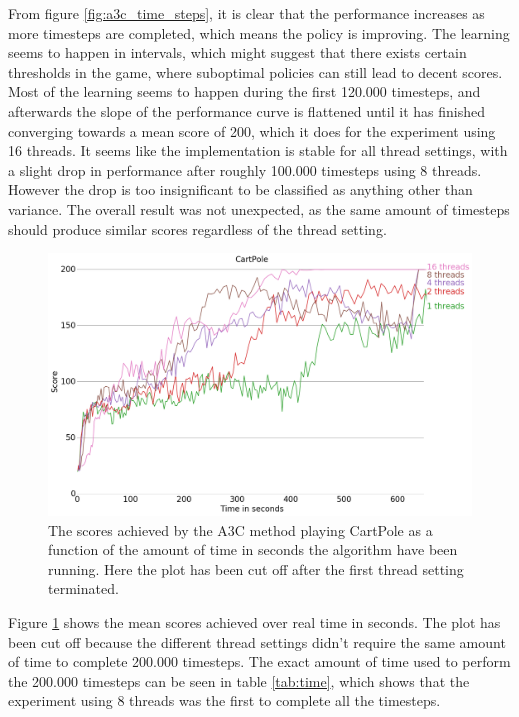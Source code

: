 \documentclass[11pt]{article}
\begin{document}
From figure \ref{fig:a3c_time_steps}, it is clear that the
performance increases as more timesteps are completed, which means
the policy is improving.
The learning seems to happen in intervals, which might suggest
that there exists certain thresholds in the game, where
suboptimal policies can still lead to decent scores.
Most of the learning seems to happen during the first 120.000 timesteps,
and afterwards the slope of the performance curve
is flattened until it has finished converging towards a mean score
of 200, which it does for the experiment using 16 threads.
It seems like the implementation is stable for all thread settings, with a slight
drop in performance after roughly 100.000 timesteps using 8 threads.
However the drop is too insignificant to be classified as anything other than variance.
The overall result was not unexpected, as the same amount of timesteps should produce similar
scores regardless of the thread setting. 

\begin{figure}[H]
    \centering
    \includegraphics[scale=0.4]{plots/cartpole_compare_time_without_AC.png}
    \caption{The scores achieved by the A3C method playing CartPole as a function
    of the amount of time in seconds the algorithm have been running.
    Here the plot has been cut off after the first thread setting
    terminated.}
    \label{fig:a3c_time}
\end{figure}

Figure \ref{fig:a3c_time} shows the mean scores achieved over real time in seconds.
The plot has been cut off because the different thread settings didn't require the
same amount of time to complete 200.000 timesteps.
The exact amount of time used to perform the 200.000 timesteps can be seen in
table \ref{tab:time}, which shows that
the experiment using 8 threads was the first to complete all the timesteps.
\end{document}
